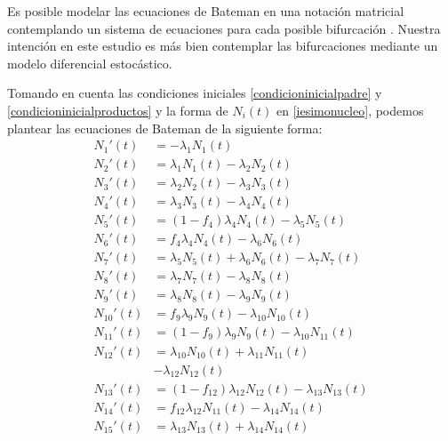 Es posible modelar las ecuaciones de Bateman en una notación matricial contemplando un sistema de ecuaciones para cada posible bifurcación \cite{Pratiwi.2021}. Nuestra intención en este estudio es más bien contemplar las bifurcaciones mediante un modelo diferencial estocástico.

Tomando en cuenta las condiciones iniciales \ref{condicioninicialpadre} y \ref{condicioninicialproductos} y la forma de $N_i(t)$ en \ref{iesimonucleo}, podemos plantear las ecuaciones de Bateman de la siguiente forma:
\begin{align}
    N_1'(t)&=-\lambda_1 N_1(t)\\ \label{ecubateman1} %
    N_2'(t)&=\lambda_1 N_1(t) -\lambda_2 N_2(t)\\ %
    N_3'(t)&=\lambda_2 N_2(t) -\lambda_3 N_3(t)\\ %
    N_4'(t)&=\lambda_3 N_3(t) -\lambda_4 N_4(t)\\ %
    N_5'(t)&=(1-f_4)\lambda_4 N_4(t) -\lambda_5 N_5(t)\\ %
    N_6'(t)&=f_4 \lambda_4 N_4(t) -\lambda_6 N_6(t)\\ %
    N_7'(t)&=\lambda_5 N_5(t) + \lambda_6 N_6(t) -\lambda_7 N_7(t)\\ %
    N_8'(t)&=\lambda_7 N_7(t) -\lambda_8 N_8(t)\\ %
    N_9'(t)&=\lambda_8 N_8(t) -\lambda_9 N_9(t)\\ %
    N_{10}'(t)&=f_9\lambda_9 N_9(t) -\lambda_{10} N_{10}(t)\\ %
    N_{11}'(t)&=(1-f_9)\lambda_9 N_9(t) -\lambda_{10} N_{11}(t)\\ %
%
   \nonumber N_{12}'(t)&=\lambda_{10} N_{10}(t) +\lambda_{11} N_{11}(t)\\
   &-\lambda_{12} N_{12}(t)\\ %
    N_{13}'(t)&=(1-f_{12})\lambda_{12} N_{12}(t) -\lambda_{13} N_{13}(t)\\ %
    N_{14}'(t)&=f_{12}\lambda_{12}N_{11}(t) -\lambda_{14} N_{14}(t)\\ %
    N_{15}'(t)&=\lambda_{13} N_{13}(t) + \lambda_{14} N_{14}(t) %
    \label{ecubateman15}
\end{align}

